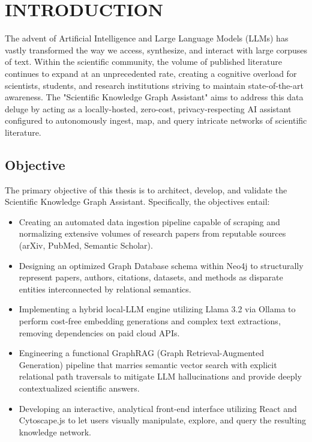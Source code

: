\documentclass[12pt,a4paper]{report}
\begin{document}
\chapter{INTRODUCTION}
\noindent{\rule{\textwidth}{1.5pt}}
\setcounter{page}{1}

The advent of Artificial Intelligence and Large Language Models (LLMs) has vastly transformed the way we access, synthesize, and interact with large corpuses of text. Within the scientific community, the volume of published literature continues to expand at an unprecedented rate, creating a cognitive overload for scientists, students, and research institutions striving to maintain state-of-the-art awareness. The "Scientific Knowledge Graph Assistant" aims to address this data deluge by acting as a locally-hosted, zero-cost, privacy-respecting AI assistant configured to autonomously ingest, map, and query intricate networks of scientific literature.

\section{Objective}
The primary objective of this thesis is to architect, develop, and validate the Scientific Knowledge Graph Assistant. Specifically, the objectives entail:
\begin{itemize}
    \item Creating an automated data ingestion pipeline capable of scraping and normalizing extensive volumes of research papers from reputable sources (arXiv, PubMed, Semantic Scholar).
    \item Designing an optimized Graph Database schema within Neo4j to structurally represent papers, authors, citations, datasets, and methods as disparate entities interconnected by relational semantics.
    \item Implementing a hybrid local-LLM engine utilizing Llama 3.2 via Ollama to perform cost-free embedding generations and complex text extractions, removing dependencies on paid cloud APIs.
    \item Engineering a functional GraphRAG (Graph Retrieval-Augmented Generation) pipeline that marries semantic vector search with explicit relational path traversals to mitigate LLM hallucinations and provide deeply contextualized scientific answers.
    \item Developing an interactive, analytical front-end interface utilizing React and Cytoscape.js to let users visually manipulate, explore, and query the resulting knowledge network.
\end{itemize}
\end{document}
